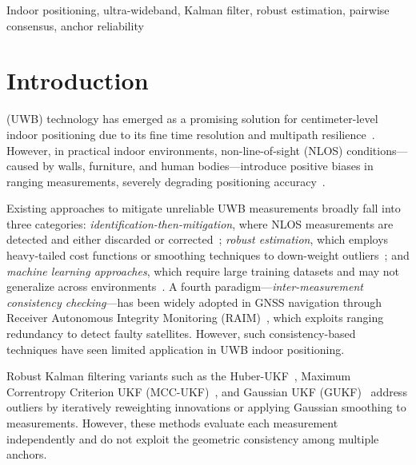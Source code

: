 \documentclass[journal]{IEEEtran}
\begin{document}
\begin{IEEEkeywords}
Indoor positioning, ultra-wideband, Kalman filter, robust estimation, pairwise consensus, anchor reliability
\end{IEEEkeywords}

\section{Introduction}

 (UWB) technology has emerged as a promising solution for centimeter-level indoor positioning due to its fine time resolution and multipath resilience~\cite{uwb_survey}. However, in practical indoor environments, non-line-of-sight (NLOS) conditions---caused by walls, furniture, and human bodies---introduce positive biases in ranging measurements, severely degrading positioning accuracy~\cite{nlos_survey}.

Existing approaches to mitigate unreliable UWB measurements broadly fall into three categories: \emph{identification-then-mitigation}, where NLOS measurements are detected and either discarded or corrected~\cite{nlos_identify}; \emph{robust estimation}, which employs heavy-tailed cost functions or smoothing techniques to down-weight outliers~\cite{huber_ukf, mcc_ukf, mcc_ukf_uwb, gukf}; and \emph{machine learning approaches}, which require large training datasets and may not generalize across environments~\cite{ml_uwb}. A fourth paradigm---\emph{inter-measurement consistency checking}---has been widely adopted in GNSS navigation through Receiver Autonomous Integrity Monitoring (RAIM)~\cite{raim, raim_survey}, which exploits ranging redundancy to detect faulty satellites. However, such consistency-based techniques have seen limited application in UWB indoor positioning.

Robust Kalman filtering variants such as the Huber-UKF~\cite{huber_ukf}, Maximum Correntropy Criterion UKF (MCC-UKF)~\cite{mcc_ukf, mcc_ukf_uwb}, and Gaussian UKF (GUKF)~\cite{gukf} address outliers by iteratively reweighting innovations or applying Gaussian smoothing to measurements. However, these methods evaluate each measurement independently and do not exploit the geometric consistency among multiple anchors.
\end{document}
